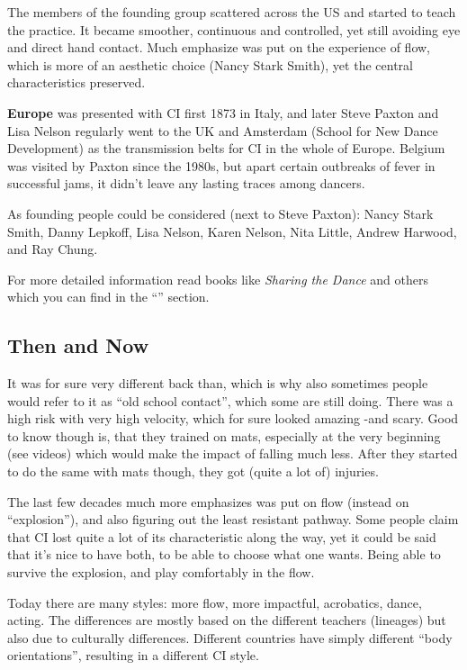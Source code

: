 The members of the founding group scattered across the US and started to teach the practice.
It became smoother, continuous and controlled, yet still avoiding eye and direct hand contact.
Much emphasize was put on the experience of flow, which is more of an aesthetic choice (Nancy Stark Smith), yet the central characteristics preserved.

\textbf{Europe} was presented with CI first 1873 in Italy, and later Steve Paxton and Lisa Nelson regularly went to the UK and Amsterdam (School for New Dance Development) as the transmission belts for CI in the whole of Europe.
Belgium was visited by Paxton since the 1980s, but apart certain outbreaks of fever in successful jams, it didn't leave any lasting traces among dancers.

As founding people could be considered (next to Steve Paxton): Nancy Stark Smith, Danny Lepkoff, Lisa Nelson, Karen Nelson, Nita Little, Andrew Harwood, and Ray Chung.

For more detailed information read books like \textit{Sharing the Dance} and others which you can find in the ``'' section.

\subsection{Then and Now}\label{subsec:then-and-now}

It was for sure very different back than, which is why also sometimes people would refer to it as ``old school contact'', which some are still doing.
There was a high risk with very high velocity, which for sure looked amazing -and scary.
Good to know though is, that they trained on mats, especially at the very beginning (see videos) which would make the impact of falling much less.
After they started to do the same with mats though, they got (quite a lot of) injuries.

The last few decades much more emphasizes was put on flow (instead on ``explosion''), and also figuring out the least resistant pathway.
Some people claim that CI lost quite a lot of its characteristic along the way, yet it could be said that it's nice to have both, to be able to choose what one wants.
Being able to survive the explosion, and play comfortably in the flow.

Today there are many styles: more flow, more impactful, acrobatics, dance, acting.
The differences are mostly based on the different teachers (lineages) but also due to culturally differences.
Different countries have simply different ``body orientations'', resulting in a different CI style.
